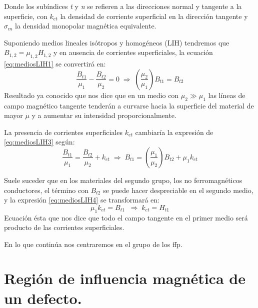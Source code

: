 Donde los subíndices \textit{t} y \textit{n} se refieren a las direcciones normal y tangente a la superficie, con $k_{et}$ la densidad de corriente superficial en la dirección tangente y $\sigma_{m}$ la densidad monopolar magnética equivalente.

Suponiendo medios lineales isótropos y homogéneos (LIH) tendremos que $B_{1,2} = \mu_{1,2} H_{1,2}$ y en ausencia de corrientes superficiales, la ecuación \ref{eq:mediosLIH1} se convertirá en:
\begin{equation}
	\label{eq:mediosLIH3}
	\frac{B_{t1}}{\mu_{1}} - \frac{B_{t2}}{\mu_{2}} = 0 \; \Rightarrow\;  
	\left( \frac{ \mu_{2} }{ \mu_{1} } \right) B_{t1} = B_{t2} 
\end{equation}
Resultado ya conocido que nos dice que en un medio con $\mu_{2} \gg \mu_{1}$ las líneas de campo magnético tangente tenderán a curvarse hacia la superficie del material de mayor $\mu$ y a aumentar su intensidad proporcionalmente.

La presencia de corrientes superficiales $k_{et}$ cambiaría la expresión de \ref{eq:mediosLIH3} según:
\begin{equation}
	\label{eq:mediosLIH4}
	\frac{B_{t1}}{\mu_{1}} = \frac{B_{t2}}{\mu_{2}} + k_{et} \; \Rightarrow \;
	B_{t1} = \left( \frac{ \mu_{1} }{ \mu_{2} } \right) B_{t2} + \mu_{1} k_{et} 
\end{equation}

Suele suceder que en los materiales del segundo grupo, los no ferromagnéticos conductores, el término con $B_{t2}$ se puede hacer despreciable en el segundo medio, y la expresión \ref{eq:mediosLIH4} se transformará en:
\begin{equation}
	\label{eq:mediosLIH5}
	\mu_{1} k_{et} = B_{t1}\;\;\Rightarrow \; k_{et} = H_{t1}
\end{equation}
Ecuación ésta que nos dice que todo el campo tangente en el primer medio será producto de las corrientes superficiales.

En lo que continúa nos centraremos en el grupo de los ffp.



\section{Región de influencia magnética de un defecto.}

